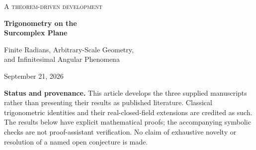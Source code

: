 \documentclass[11pt,letterpaper]{article}
\theoremstyle{definition}
\theoremstyle{remark}
\newcommand{\No}{\mathbf{No}}
\newcommand{\SC}{\mathbf{SC}}
\numberwithin{equation}{section}
\begin{document}
\begin{titlepage}
\centering
\vspace*{0.65cm}
{\large\scshape A theorem-driven development\par}
\vspace{0.8cm}
{\Huge\bfseries Trigonometry on the\\[0.18em] Surcomplex Plane\par}
\vspace{0.65cm}
{\LARGE Finite Radians, Arbitrary-Scale Geometry,\\[0.15em]
 and Infinitesimal Angular Phenomena\par}
\vspace{0.7cm}
{\large September 21, 2026\par}
\vspace{0.8cm}
\begin{minipage}{0.93\textwidth}
\begin{abstract}
A triangle with infinitely long sides need not have an infinite angle. We construct a trigonometry of the entire surcomplex plane $\SC=\No[i]$ in which every direction has a finite surreal radian representative. The unit-circle group is canonically isomorphic to the additive group of finite surreals modulo $2\pi\Z$, and also to the product of the ordinary circle with the additive group of surreal infinitesimals. These statements connect algebraic rotations to strongly summable Taylor trigonometry without choosing a sine at infinite real arguments.

We prove the triangle angle-sum theorem, the sine and cosine laws, half-angle and tangent laws, Heron's formula, trigonometric Ceva, and Ptolemy at arbitrary surreal scales. Further results identify angular valuations, quantify flattening of nearly degenerate triangles, and give exact finite harmonic analysis and a Fej\'er--Riesz factorization over the surcomplex field. An explicit degree-two trigonometric polynomial is positive at every ordinary angle but negative at an infinitesimal angle.

We also treat inverse functions, square-root splitting at an extremum, coupled infinitesimal angular constraints, and sharp perturbation bounds near an almost multiple angular root. Canonical complex trigonometry extends to every argument with finite real part and arbitrary surreal imaginary part. Finally, we classify the freedom in global homomorphic phases and explain why differential equations and local analyticity do not determine oscillation at infinite real arguments.
\end{abstract}
\end{minipage}
\vfill
\begin{minipage}{0.93\textwidth}\small
\textbf{Status and provenance.} This article develops the three supplied manuscripts rather than presenting their results as published literature. Classical trigonometric identities and their real-closed-field extensions are credited as such. The results below have explicit mathematical proofs; the accompanying symbolic checks are not proof-assistant verification. No claim of exhaustive novelty or resolution of a named open conjecture is made.
\end{minipage}
\end{titlepage}
\end{document}
